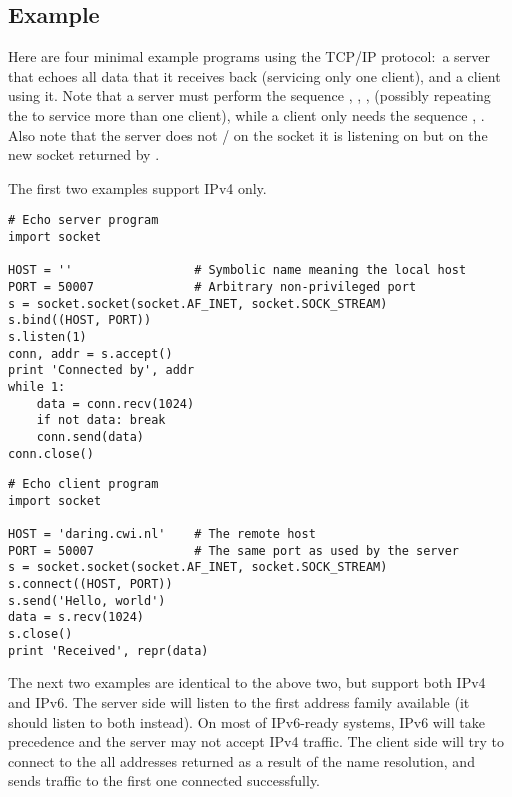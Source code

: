 \subsection{Example \label{socket-example}}

Here are four minimal example programs using the TCP/IP protocol:\ a
server that echoes all data that it receives back (servicing only one
client), and a client using it.  Note that a server must perform the
sequence , , ,
 (possibly repeating the  to service
more than one client), while a client only needs the sequence
, .  Also note that the server
does not / on the 
socket it is listening on but on the new socket returned by
.

The first two examples support IPv4 only.

\begin{verbatim}
# Echo server program
import socket

HOST = ''                 # Symbolic name meaning the local host
PORT = 50007              # Arbitrary non-privileged port
s = socket.socket(socket.AF_INET, socket.SOCK_STREAM)
s.bind((HOST, PORT))
s.listen(1)
conn, addr = s.accept()
print 'Connected by', addr
while 1:
    data = conn.recv(1024)
    if not data: break
    conn.send(data)
conn.close()
\end{verbatim}

\begin{verbatim}
# Echo client program
import socket

HOST = 'daring.cwi.nl'    # The remote host
PORT = 50007              # The same port as used by the server
s = socket.socket(socket.AF_INET, socket.SOCK_STREAM)
s.connect((HOST, PORT))
s.send('Hello, world')
data = s.recv(1024)
s.close()
print 'Received', repr(data)
\end{verbatim}

The next two examples are identical to the above two, but support both
IPv4 and IPv6.
The server side will listen to the first address family available
(it should listen to both instead).
On most of IPv6-ready systems, IPv6 will take precedence
and the server may not accept IPv4 traffic.
The client side will try to connect to the all addresses returned as a result
of the name resolution, and sends traffic to the first one connected
successfully.


